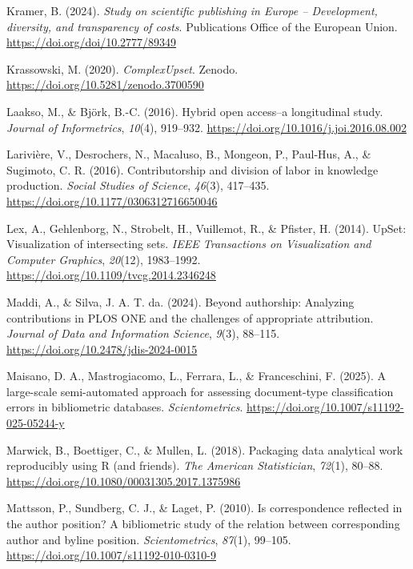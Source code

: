 \documentclass[a4paper,man,floatsintext,longtable,noextraspace,10pt]{apa6}
\newlength{\cslhangindent}
\newenvironment{CSLReferences}[2] %
{\begin{list}{}{%
  \setlength{\itemindent}{0pt}
  \setlength{\leftmargin}{0pt}
  \setlength{\parsep}{0pt}
  \ifodd #1
  \setlength{\leftmargin}{\cslhangindent}
  \setlength{\itemindent}{-1\cslhangindent}
  \fi
  \setlength{\itemsep}{#2\baselineskip}}}
{\end{list}}
\begin{document}
\begin{CSLReferences}{1}{0}
Kramer, B. (2024). \emph{Study on scientific publishing in {Europe} --
{Development}, diversity, and transparency of costs}. Publications
Office of the European Union. \url{https://doi.org/doi/10.2777/89349}

Krassowski, M. (2020). \emph{ComplexUpset}. Zenodo.
\url{https://doi.org/10.5281/zenodo.3700590}

Laakso, M., \& Björk, B.-C. (2016). Hybrid open access--a longitudinal
study. \emph{Journal of Informetrics}, \emph{10}(4), 919--932.
\url{https://doi.org/10.1016/j.joi.2016.08.002}

Larivière, V., Desrochers, N., Macaluso, B., Mongeon, P., Paul-Hus, A.,
\& Sugimoto, C. R. (2016). Contributorship and division of labor in
knowledge production. \emph{Social Studies of Science}, \emph{46}(3),
417--435. \url{https://doi.org/10.1177/0306312716650046}

Lex, A., Gehlenborg, N., Strobelt, H., Vuillemot, R., \& Pfister, H.
(2014). UpSet: Visualization of intersecting sets. \emph{IEEE
Transactions on Visualization and Computer Graphics}, \emph{20}(12),
1983--1992. \url{https://doi.org/10.1109/tvcg.2014.2346248}

Maddi, A., \& Silva, J. A. T. da. (2024). Beyond authorship: Analyzing
contributions in PLOS ONE and the challenges of appropriate attribution.
\emph{Journal of Data and Information Science}, \emph{9}(3), 88--115.
\url{https://doi.org/10.2478/jdis-2024-0015}

Maisano, D. A., Mastrogiacomo, L., Ferrara, L., \& Franceschini, F.
(2025). A large-scale semi-automated approach for assessing
document-type classification errors in bibliometric databases.
\emph{Scientometrics}. \url{https://doi.org/10.1007/s11192-025-05244-y}

Marwick, B., Boettiger, C., \& Mullen, L. (2018). Packaging data
analytical work reproducibly using {R} (and friends). \emph{The American
Statistician}, \emph{72}(1), 80--88.
\url{https://doi.org/10.1080/00031305.2017.1375986}

Mattsson, P., Sundberg, C. J., \& Laget, P. (2010). Is correspondence
reflected in the author position? A bibliometric study of the relation
between corresponding author and byline position. \emph{Scientometrics},
\emph{87}(1), 99--105. \url{https://doi.org/10.1007/s11192-010-0310-9}


\end{CSLReferences}
\end{document}
